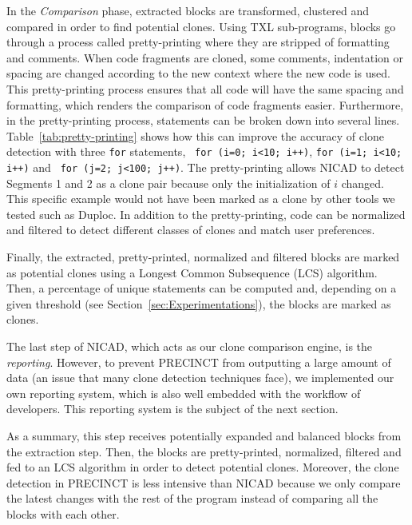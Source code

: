 \documentclass[conference]{IEEEtran}
\begin{document}
In the \textit{Comparison} phase, extracted blocks are transformed, clustered and compared in order to find potential clones.
Using TXL sub-programs, blocks go through a process called pretty-printing where they are stripped of formatting and comments.
When code fragments are cloned, some comments, indentation or spacing are changed according to the new context where the new code is used. This pretty-printing process ensures that all code will have the same spacing and formatting, which renders the comparison of code fragments easier.
Furthermore, in the pretty-printing process, statements can be broken down into several lines.
Table~\ref{tab:pretty-printing} shows how this can improve the accuracy of clone detection with three \texttt{for} statements, \texttt{ for (i=0; i<10; i++)}, \texttt{for (i=1; i<10; i++)} and \texttt{ for (j=2; j<100; j++)}.
The pretty-printing allows NICAD to detect Segments 1 and 2 as a clone pair because only the initialization of $i$ changed.
This specific example would not have been marked as a clone by other  tools we tested such as Duploc\cite{Ducasse1999}.
In addition to the pretty-printing, code can be normalized and filtered to detect different classes of clones and match user preferences.



Finally, the extracted, pretty-printed, normalized and filtered blocks are marked as potential clones using a Longest Common Subsequence (LCS) algorithm\cite{Hunt1977}. Then, a percentage of unique statements can be computed and, depending on a given threshold (see Section~\ref{sec:Experimentations}), the blocks are marked as clones.

The last step of NICAD, which acts as our clone comparison engine, is the \textit{reporting}. However, to prevent PRECINCT from outputting a large amount of data (an issue that many clone detection techniques face), we  implemented our own reporting system, which is also well embedded with the workflow of developers. This reporting system is the subject of the next section.

As a summary, this step receives potentially expanded and balanced blocks from the extraction step.
Then, the blocks are pretty-printed, normalized, filtered and fed to an LCS algorithm in order to detect potential clones.
Moreover, the clone detection in PRECINCT is less intensive than NICAD because we only compare the latest changes with the rest of the program instead of comparing all the blocks with each other.
\end{document}

